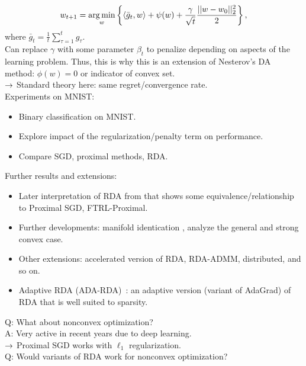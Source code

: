 \begin{equation}
    w_{t+1} = \operatorname*{arg\,min}_w \left\{\langle \bar{g}_t, w \rangle + \psi(w) + \frac{\gamma}{\sqrt{t}} \frac{||w - w_0||_2^2}{2}\right\},
\end{equation}
where $\bar{g}_t = \frac{1}{t}\sum_{\tau=1}^t g_\tau$. \\

Can replace $\gamma$ with some parameter $\beta_t$ to penalize depending on aspects of the learning problem. Thus, this is why this is an extension of Nesterov's DA method: $\phi(w) = 0$ or indicator of convex set. \\

$\rightarrow$ Standard theory here: same regret/convergence rate. \\

Experiments on MNIST:
\begin{itemize}
    \item Binary classification on MNIST.
    \item Explore impact of the regularization/penalty term on performance.
    \item Compare SGD, proximal methods, RDA.
\end{itemize}

Further results and extensions:
\begin{itemize}
    \item Later interpretation of RDA from \citet{mcmahan2011follow} that shows some equivalence/relationship to Proximal SGD, FTRL-Proximal.
    \item Further developments: manifold identication \cite{lee2012manifold}, analyze the general and strong convex case.
    \item Other extensions: accelerated version of RDA, RDA-ADMM, distributed, and so on.
    
    \item Adaptive RDA (ADA-RDA)~\cite{duchi2011adaptive}: an adaptive version (variant of AdaGrad) of RDA that is well suited to sparsity.
\end{itemize}

Q: What about nonconvex optimization? \\

A: Very active in recent years due to deep learning. \\

$\rightarrow$ Proximal SGD works with $\ell_1$ regularization. \\

Q: Would variants of RDA work for nonconvex optimization? \\

